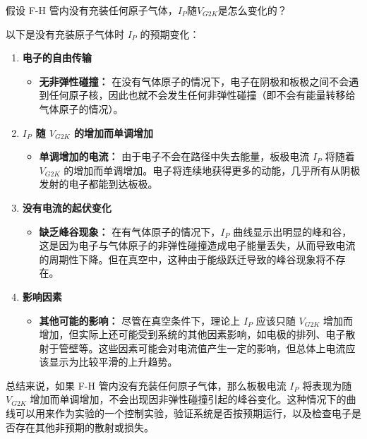 \documentclass[dvipsnames, svgnames,a4paper,11pt]{article}
\begin{document}
	
	\begin{question}
		假设 F-H 管内没有充装任何原子气体，$I_P$随$V_{G2K}$是怎么变化的？
	\end{question}
	以下是没有充装原子气体时 \( I_P \) 的预期变化：
	\begin{enumerate}
		\item \textbf{电子的自由传输}
		
		\begin{itemize}
			\item \textbf{无非弹性碰撞：} 在没有气体原子的情况下，电子在阴极和板极之间不会遇到任何原子核，因此也就不会发生任何非弹性碰撞（即不会有能量转移给气体原子的情况）。
		\end{itemize}
		
		\item \textbf{\( I_P \) 随 \( V_{G2K} \) 的增加而单调增加}
		
		\begin{itemize}
			\item \textbf{单调增加的电流：} 由于电子不会在路径中失去能量，板极电流 \( I_P \) 将随着 \( V_{G2K} \) 的增加而单调增加。电子将连续地获得更多的动能，几乎所有从阴极发射的电子都能到达板极。
		\end{itemize}
		
		\item \textbf{没有电流的起伏变化}
		
		\begin{itemize}
			\item \textbf{缺乏峰谷现象：} 在有气体原子的情况下，\( I_P \) 曲线显示出明显的峰和谷，这是因为电子与气体原子的非弹性碰撞造成电子能量丢失，从而导致电流的周期性下降。但在真空中，这种由于能级跃迁导致的峰谷现象将不存在。
		\end{itemize}
		
		\item \textbf{影响因素}
		
		\begin{itemize}
			\item \textbf{其他可能的影响：} 尽管在真空条件下，理论上 \( I_P \) 应该只随 \( V_{G2K} \) 增加而增加，但实际上还可能受到系统的其他因素影响，如电极的排列、电子散射于管壁等。这些因素可能会对电流值产生一定的影响，但总体上电流应该显示为比较平滑的上升趋势。
		\end{itemize}
	\end{enumerate}
	
	总结来说，如果 F-H 管内没有充装任何原子气体，那么板极电流 \( I_P \) 将表现为随 \( V_{G2K} \) 增加而单调增加，不会出现因非弹性碰撞引起的峰谷变化。这种情况下的曲线可以用来作为实验的一个控制实验，验证系统是否按预期运行，以及检查电子是否存在其他非预期的散射或损失。
	
\end{document}
